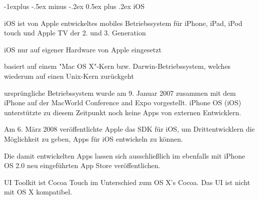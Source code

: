 \documentclass[a4paper]{article}
\makeatletter
\renewcommand{\subsection}{\@startsection{subsection}{2}{0mm}%
                                {-1explus -.5ex minus -.2ex}%
                                {0.5ex plus .2ex}%
                                {\normalfont\normalsize\bfseries}}
\makeatother
\begin{document}
\begin{multicols*}{2}
  \subsection{iOS}
  \begin{itemize*}
    \item iOS ist von Apple entwickeltes mobiles Betriebssystem für iPhone, iPad, iPod touch und Apple TV der 2. und 3. Generation
    \item iOS nur auf eigener Hardware von Apple eingesetzt
    \item basiert auf einem "Mac OS X"-Kern bzw. Darwin-Betriebssystem, welches wiederum auf einen Unix-Kern zurückgeht
    \item ursprüngliche Betriebssystem wurde am 9. Januar 2007 zusammen mit dem iPhone auf der MacWorld Conference and Expo vorgestellt. iPhone OS (iOS) unterstützte zu diesem Zeitpunkt noch keine Apps von externen Entwicklern.
    \item Am 6. März 2008 veröffentlichte Apple das SDK für iOS, um Drittentwicklern die Möglichkeit zu geben, Apps für iOS entwickeln zu können.
    \item Die damit entwickelten Apps lassen sich ausschließlich im ebenfalls mit iPhone OS 2.0 neu eingeführten App Store veröffentlichen.
    \item UI Toolkit ist Cocoa Touch im Unterschied zum OS X's Cocoa. Das UI ist nicht mit OS X kompatibel.
  \end{itemize*}


\end{multicols*}
\end{document}
